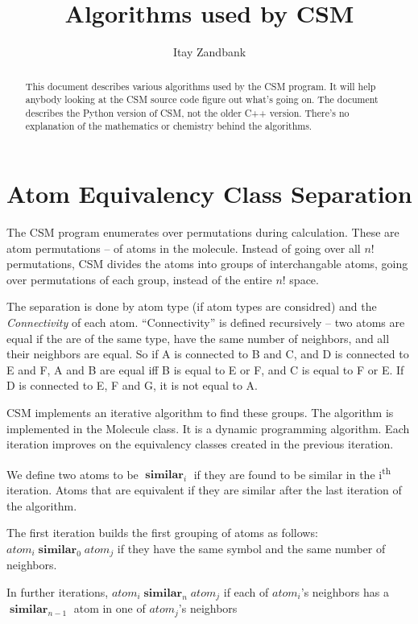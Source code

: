 \documentclass[]{article}
\title{Algorithms used by CSM}
\author{Itay Zandbank}
\DeclareMathOperator*{\similar}{\mathbf{similar}}
\begin{document}
\maketitle

\begin{abstract}
This document describes various algorithms used by the CSM program. It will help anybody looking at the CSM source code figure out what's going on. The document describes the Python version of CSM, not the older C++ version. There's no explanation of the mathematics or chemistry behind the algorithms.
\end{abstract}

\section{Atom Equivalency Class Separation}

The CSM program enumerates over permutations during calculation. These are atom permutations – of atoms in the molecule. Instead of going over all $n!$ permutations, CSM divides the atoms into groups of interchangable atoms, going over permutations of each group, instead of the entire $n!$ space.
  
The separation is done by atom type (if atom types are considred) and the \emph{Connectivity} of each atom. “Connectivity” is defined recursively – two atoms are equal if the are of the same type, have the same number of neighbors, and all their neighbors are equal. So if A is connected to B and C, and D is connected to E and F, A and B are equal iff B is equal to E or F, and C is equal to F or E. If D is connected to E, F and G, it is not equal to A.
  
CSM implements an iterative algorithm to find these groups. The algorithm is implemented in the Molecule class. It is a dynamic programming algorithm. Each iteration improves on the equivalency classes created in the previous iteration. 

We define two atoms to be $\similar_{i}$ if they are found to be similar in the i\textsuperscript{th} iteration. Atoms that are equivalent if they are similar after the last iteration of the algorithm. 

The first iteration builds the first grouping of atoms as follows: $atom_i \similar_{0} atom_j$ if they have the same symbol and the same number of neighbors.

In further iterations, $atom_i \similar_{n} atom_j$ if each of $atom_i$'s neighbors has a $\similar_{n-1}$ atom in one of $atom_j$'s neighbors
\end{document}

